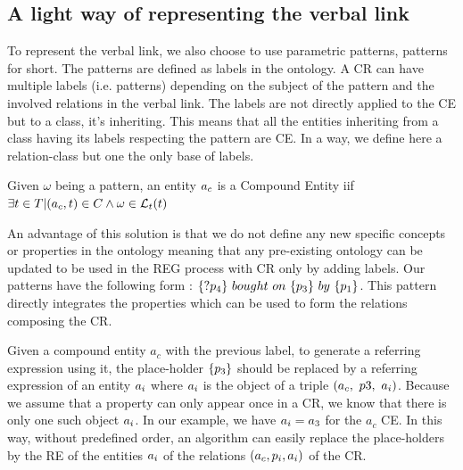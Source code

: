 \subsection{A light way of representing the verbal link}

To represent the verbal link, we also choose to use parametric patterns, patterns for short. The patterns are defined as labels in the ontology. A CR can have multiple labels (i.e. patterns) depending on the subject of the pattern and the involved relations in the verbal link. The labels are not directly applied to the CE but to a class, it's inheriting. This means that all the entities inheriting from a class having its labels respecting the pattern are CE. In a way, we define here a relation-class but one the only base of labels.

\begin{theorem} 
\label{the:compound_entity}
Given $\omega$ being a pattern, an entity $a_c$ is a Compound Entity iif $\exists t \in T | (a_c, t) \in C \land \omega \in \mathcal{L}_t{(t)}$
\end{theorem}

An advantage of this solution is that we do not define any new specific concepts or properties in the ontology meaning that any pre-existing ontology can be updated to be used in the REG process with CR only by adding labels. Our patterns have the following form : $\{?\property_4\}\ bought\ on\ \{\property_3\}\ by\ \{\property_1\}$. This pattern directly integrates the properties which can be used to form the relations composing the CR.

Given a compound entity $a_c$ with the previous label, to generate a referring expression using it, the place-holder $\{p_3\}$ should be replaced by a referring expression of an entity $a_i$ where $a_i$ is the object of a triple $(a_c,\ p3,\ a_i)$. Because we assume that a property can only appear once in a CR, we know that there is only one such object $a_i$. In our example, we have $a_i = a_3$ for the $a_c$ CE.
In this way, without predefined order, an algorithm can easily replace the place-holders by the RE of the entities $a_i$ of the relations $(a_c, p_i, a_i)$ of the CR.

